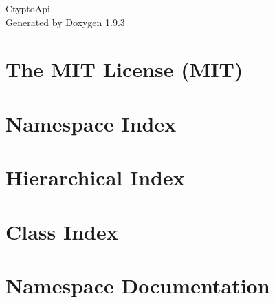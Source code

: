 \documentclass[twoside]{book}
\newcommand{\+}{\discretionary{\mbox{\scriptsize$\hookleftarrow$}}{}{}}
\newcommand{\clearemptydoublepage}{%
    \newpage{\pagestyle{empty}\cleardoublepage}%
  }
\begin{document}
  \raggedbottom
    \hypersetup{pageanchor=false,
                bookmarksnumbered=true,
                pdfencoding=unicode
               }
  \begin{titlepage}
  \vspace*{7cm}
  \begin{center}%
  {\Large Ctypto\+Api}\\
  \vspace*{1cm}
  {\large Generated by Doxygen 1.9.3}\\
  \end{center}
  \end{titlepage}
  \clearemptydoublepage
  \tableofcontents
  \clearemptydoublepage
  \hypersetup{pageanchor=true}
\chapter{The MIT License (MIT)}
\label{md_wwwroot_lib_jquery_validation__l_i_c_e_n_s_e}

\chapter{Namespace Index}

\chapter{Hierarchical Index}

\chapter{Class Index}

\chapter{Namespace Documentation}










\end{document}
